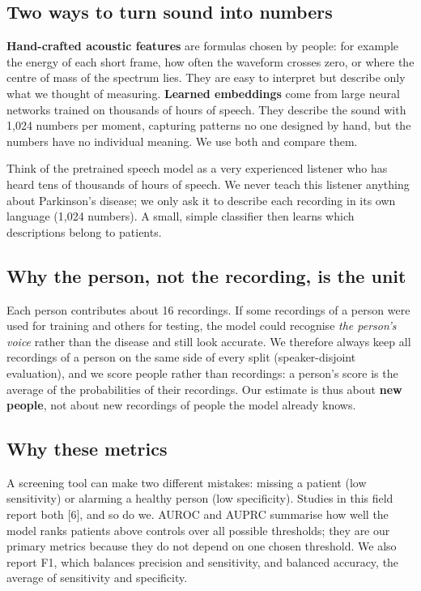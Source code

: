 \documentclass[11pt,a4paper]{article}
\begin{document}
\subsection{Two ways to turn sound into numbers}
\textbf{Hand-crafted acoustic features} are formulas chosen by people: for example the energy of each short frame, how often the waveform crosses zero, or where the centre of mass of the spectrum lies. They are easy to interpret but describe only what we thought of measuring. \textbf{Learned embeddings} come from large neural networks trained on thousands of hours of speech. They describe the sound with 1,024 numbers per moment, capturing patterns no one designed by hand, but the numbers have no individual meaning. We use both and compare them.

\begin{tcolorbox}[colback=green!3,colframe=green!40!black,boxrule=0.5pt,arc=2pt,left=5pt,right=5pt,top=3pt,bottom=3pt,title={\small\bfseries In plain words}]\small Think of the pretrained speech model as a very experienced listener who has heard tens of thousands of hours of speech. We never teach this listener anything about Parkinson's disease; we only ask it to describe each recording in its own language (1,024 numbers). A small, simple classifier then learns which descriptions belong to patients.\end{tcolorbox}
\subsection{Why the person, not the recording, is the unit}
Each person contributes about 16 recordings. If some recordings of a person were used for training and others for testing, the model could recognise \emph{the person's voice} rather than the disease and still look accurate. We therefore always keep all recordings of a person on the same side of every split (speaker-disjoint evaluation), and we score people rather than recordings: a person's score is the average of the probabilities of their recordings. Our estimate is thus about \textbf{new people}, not about new recordings of people the model already knows.

\subsection{Why these metrics}
A screening tool can make two different mistakes: missing a patient (low sensitivity) or alarming a healthy person (low specificity). Studies in this field report both [6], and so do we. AUROC and AUPRC summarise how well the model ranks patients above controls over all possible thresholds; they are our primary metrics because they do not depend on one chosen threshold. We also report F1, which balances precision and sensitivity, and balanced accuracy, the average of sensitivity and specificity.
\end{document}
